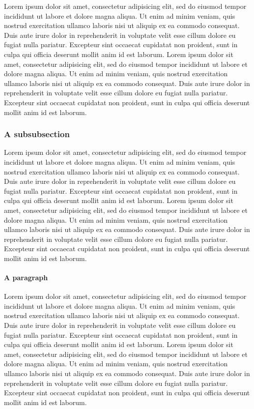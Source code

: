 \documentclass{article}
\begin{document}
Lorem ipsum dolor sit amet, consectetur adipisicing elit, sed do eiusmod tempor incididunt ut labore et dolore magna aliqua. Ut enim ad minim veniam, quis nostrud exercitation ullamco laboris nisi ut aliquip ex ea commodo consequat. Duis aute irure dolor in reprehenderit in voluptate velit esse cillum dolore eu fugiat nulla pariatur. Excepteur sint occaecat cupidatat non proident, sunt in culpa qui officia deserunt mollit anim id est laborum. Lorem ipsum dolor sit amet, consectetur adipisicing elit, sed do eiusmod tempor incididunt ut labore et dolore magna aliqua. Ut enim ad minim veniam, quis nostrud exercitation ullamco laboris nisi ut aliquip ex ea commodo consequat. Duis aute irure dolor in reprehenderit in voluptate velit esse cillum dolore eu fugiat nulla pariatur. Excepteur sint occaecat cupidatat non proident, sunt in culpa qui officia deserunt mollit anim id est laborum.

\subsubsection{A subsubsection}

Lorem ipsum dolor sit amet, consectetur adipisicing elit, sed do eiusmod tempor incididunt ut labore et dolore magna aliqua. Ut enim ad minim veniam, quis nostrud exercitation ullamco laboris nisi ut aliquip ex ea commodo consequat. Duis aute irure dolor in reprehenderit in voluptate velit esse cillum dolore eu fugiat nulla pariatur. Excepteur sint occaecat cupidatat non proident, sunt in culpa qui officia deserunt mollit anim id est laborum. Lorem ipsum dolor sit amet, consectetur adipisicing elit, sed do eiusmod tempor incididunt ut labore et dolore magna aliqua. Ut enim ad minim veniam, quis nostrud exercitation ullamco laboris nisi ut aliquip ex ea commodo consequat. Duis aute irure dolor in reprehenderit in voluptate velit esse cillum dolore eu fugiat nulla pariatur. Excepteur sint occaecat cupidatat non proident, sunt in culpa qui officia deserunt mollit anim id est laborum.

\paragraph{A paragraph}

Lorem ipsum dolor sit amet, consectetur adipisicing elit, sed do eiusmod tempor incididunt ut labore et dolore magna aliqua. Ut enim ad minim veniam, quis nostrud exercitation ullamco laboris nisi ut aliquip ex ea commodo consequat. Duis aute irure dolor in reprehenderit in voluptate velit esse cillum dolore eu fugiat nulla pariatur. Excepteur sint occaecat cupidatat non proident, sunt in culpa qui officia deserunt mollit anim id est laborum. Lorem ipsum dolor sit amet, consectetur adipisicing elit, sed do eiusmod tempor incididunt ut labore et dolore magna aliqua. Ut enim ad minim veniam, quis nostrud exercitation ullamco laboris nisi ut aliquip ex ea commodo consequat. Duis aute irure dolor in reprehenderit in voluptate velit esse cillum dolore eu fugiat nulla pariatur. Excepteur sint occaecat cupidatat non proident, sunt in culpa qui officia deserunt mollit anim id est laborum.
\end{document}
